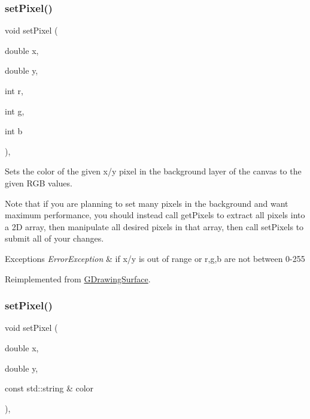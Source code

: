 \subsubsection{\texorpdfstring{set\+Pixel()}{setPixel()}\hspace{0.1cm}{\footnotesize\ttfamily [2/3]}}
{\footnotesize\ttfamily void set\+Pixel (\begin{DoxyParamCaption}\item[{double}]{x,  }\item[{double}]{y,  }\item[{int}]{r,  }\item[{int}]{g,  }\item[{int}]{b }\end{DoxyParamCaption})\hspace{0.3cm}{\ttfamily [override]}, {\ttfamily [virtual]}}



Sets the color of the given x/y pixel in the background layer of the canvas to the given R\+GB values. 

Note that if you are planning to set many pixels in the background and want maximum performance, you should instead call get\+Pixels to extract all pixels into a 2D array, then manipulate all desired pixels in that array, then call set\+Pixels to submit all of your changes.


\begin{DoxyExceptions}{Exceptions}
{\em Error\+Exception} & if x/y is out of range or r,g,b are not between 0-\/255 \\
\hline
\end{DoxyExceptions}


Reimplemented from \mbox{\hyperlink{classsgl_1_1GDrawingSurface_aec90e927c9da286214908d3f9da685d7}{G\+Drawing\+Surface}}.

\mbox{\label{classsgl_1_1GDrawingSurface_a09f9640e4ff7388dcfc391efd88d2415}} 
\subsubsection{\texorpdfstring{set\+Pixel()}{setPixel()}\hspace{0.1cm}{\footnotesize\ttfamily [3/3]}}
{\footnotesize\ttfamily void set\+Pixel (\begin{DoxyParamCaption}\item[{double}]{x,  }\item[{double}]{y,  }\item[{const std\+::string \&}]{color }\end{DoxyParamCaption})\hspace{0.3cm}{\ttfamily [virtual]}, {\ttfamily [inherited]}}



